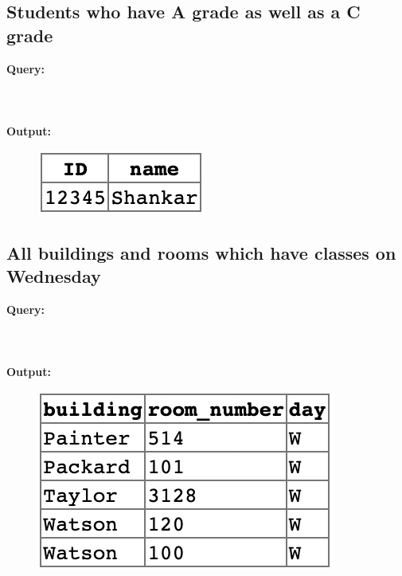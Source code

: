 \documentclass[12pt]{article}
\begin{document}
\subsection{Students who have A grade as well as a C grade}
\textbf{Query:} \\ \\
\\ \\
\textbf{Output:}
\begin{figure}[hbt]
    \centering
    \includegraphics[scale=1.2]{screenshots/problem4b.png}
    \label{fig:my_label1}
\end{figure}

\subsection{All buildings and rooms which have classes on Wednesday}
 
\textbf{Query:} \\ \\
\\ \\
\textbf{Output:}
\begin{figure}[hbt]
    \centering
    \includegraphics[scale=1.2]{screenshots/problem4c.png}
    \label{fig:my_label1}
\end{figure}
\end{document}
